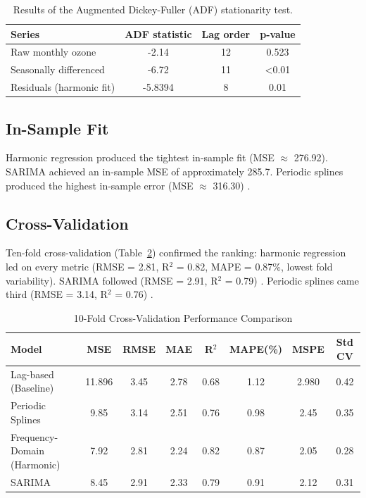 \documentclass[12pt,a4paper]{article}
\begin{document}
\begin{table}[htbp]
\centering
\caption{Results of the Augmented Dickey-Fuller (ADF) stationarity test.}
\label{tab:adf}
\begin{tabular}{lccc}
\toprule
\textbf{Series} & \textbf{ADF statistic} & \textbf{Lag order} & \textbf{p-value} \\
\midrule
Raw monthly ozone & -2.14 & 12 & 0.523 \\
Seasonally differenced & -6.72 & 11 & <0.01 \\
Residuals (harmonic fit) & -5.8394 & 8 & 0.01 \\
\bottomrule
\end{tabular}
\end{table}

\subsection{In-Sample Fit}
Harmonic regression produced the tightest in-sample fit (MSE $\approx$ 276.92). SARIMA achieved an in-sample MSE of approximately 285.7. Periodic splines produced the highest in-sample error (MSE $\approx$ 316.30) \cite{Wood2017}.

\subsection{Cross-Validation}
Ten-fold cross-validation (Table~\ref{tab:cv}) confirmed the ranking: harmonic regression led on every metric (RMSE = 2.81, R$^2$ = 0.82, MAPE = 0.87\%, lowest fold variability). SARIMA followed (RMSE = 2.91, R$^2$ = 0.79) \cite{Hyndman2021}. Periodic splines came third (RMSE = 3.14, R$^2$ = 0.76) \cite{Wood2017}.

\begin{table}[htbp]
\centering
\caption{10-Fold Cross-Validation Performance Comparison}
\label{tab:cv}
\begin{tabular}{lccccccc}
\toprule
\textbf{Model} & \textbf{MSE} & \textbf{RMSE} & \textbf{MAE} & \textbf{R$^2$} & \textbf{MAPE(\%)} & \textbf{MSPE} & \textbf{Std CV} \\
\midrule
Lag-based (Baseline) & 11.896 & 3.45 & 2.78 & 0.68 & 1.12 & 2.980 & 0.42 \\
Periodic Splines & 9.85 & 3.14 & 2.51 & 0.76 & 0.98 & 2.45 & 0.35 \\
Frequency-Domain (Harmonic) & 7.92 & 2.81 & 2.24 & 0.82 & 0.87 & 2.05 & 0.28 \\
SARIMA & 8.45 & 2.91 & 2.33 & 0.79 & 0.91 & 2.12 & 0.31 \\
\bottomrule
\end{tabular}
\end{table}
\end{document}
